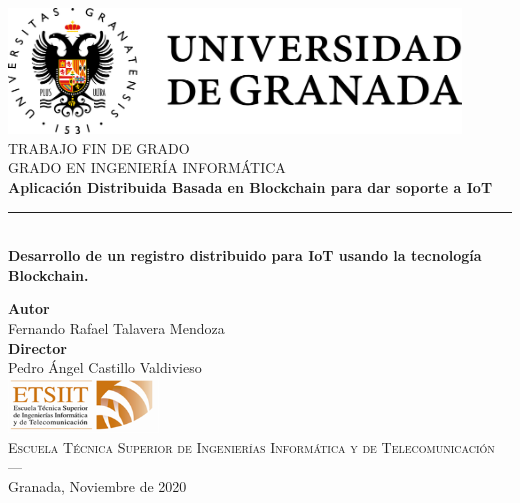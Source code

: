 \begin{titlepage}
 
\newlength{\centeroffset}
\setlength{\centeroffset}{-0.5\oddsidemargin}
\addtolength{\centeroffset}{0.5\evensidemargin}

\noindent\hspace*{\centeroffset}\begin{minipage}{\textwidth}

\centering
\includegraphics[width=0.9\textwidth]{imagenes/logo_ugr}\\[1.4cm]

\textsc{ \Large TRABAJO FIN DE GRADO\\[0.2cm]}
\textsc{ GRADO EN INGENIERÍA INFORMÁTICA}\\[1cm]
% 
{\LARGE\bfseries Aplicación Distribuida Basada en Blockchain para dar soporte a IoT\\
}
\noindent\rule[-1ex]{\textwidth}{3pt}\\[3.5ex]
{\large\bfseries Desarrollo de un registro distribuido para IoT usando la tecnología Blockchain.}
\end{minipage}

\vspace{2.5cm}
\noindent\hspace*{\centeroffset}\begin{minipage}{\textwidth}
\centering

\textbf{Autor}\\ {Fernando Rafael Talavera Mendoza}\\[2.5ex]
\textbf{Director}\\
{Pedro Ángel Castillo Valdivieso}\\[2cm]
\includegraphics[width=0.3\textwidth]{imagenes/etsiit_logo}\\[0.1cm]
\textsc{Escuela Técnica Superior de Ingenierías Informática y de Telecomunicación}\\
\textsc{---}\\
Granada, Noviembre de 2020
\end{minipage}
\end{titlepage}


